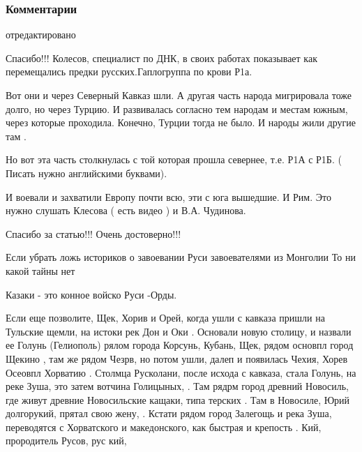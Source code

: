  
 
 
 
 

\subsubsection{Комментарии}
\label{sec:07_12_2020.sites.ru.zen_yandex.asov_alexandr.1.tajna_kazachestvo.comments}

\begin{itemize}
отредактировано

Спасибо!!! Колесов, специалист по ДНК, в своих работах показывает как
перемещались предки русских.Гаплогруппа по крови Р1а.

Вот они и через Северный Кавказ шли. А другая часть народа мигрировала тоже
долго, но через Турцию. И развивалась согласно тем народам и местам южным,
через которые проходила. Конечно, Турции тогда не было. И народы жили другие
там .

Но вот эта часть столкнулась с той которая прошла севернее, т.е. Р1А с Р1Б. (
Писать нужно английскими буквами).

И воевали и захватили Европу почти всю, эти с юга вышедшие. И Рим. Это нужно
слушать Клесова ( есть видео ) и В.А. Чудинова.

Спасибо за статью!!! Очень достоверно!!!


Если убрать ложь историков о завоевании Руси завоевателями из Монголии То ни
								какой тайны нет

Казаки - это конное войско Руси -Орды.


Если еще позволите, Щек, Хорив и Орей, когда ушли с кавказа пришли на Тульские щемли, на истоки рек Дон и Оки
.
Основали новую столицу, и назвали ее Голунь (Гелиополь) рялом города Корсунь, Кубань, Щек, рядом основпл город Щекино , там же рядом Чезрв, но потом ушли, далеп и появилась Чехия, Хорев Осеовпл Хорватию
.
Столмца Русколани, после исхода с кавказа, стала Голунь, на реке Зуша, это затем вотчина Голицыных,
.
Там рядрм город древний Новосиль, где живут древние Новосильские кащаки, типа терских
.
Там в Новосиле, Юрий долгорукий, прятал свою жену,
.
Кстати рядом город Залегощь и река Зуша, переводятся с Хорватского и македонского, как быстрая и крепость
.
Кий, прородитель Русов, рус кий,
\end{itemize}
